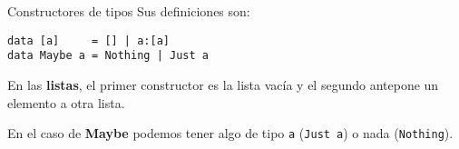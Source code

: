\begin{frame}[fragile]{Constructores de tipos}
  Sus definiciones son:

  \espacio

  \begin{lstlisting}
data [a]     = [] | a:[a]
data Maybe a = Nothing | Just a
  \end{lstlisting}

  \espacio

  En las \textbf{listas}, el primer constructor es la lista vacía y
  el segundo antepone un elemento a otra lista.

  \espacio

  En el caso de \textbf{Maybe} podemos tener algo de tipo \texttt{a} (\texttt{Just a})
  o nada (\texttt{Nothing}).

\end{frame}
